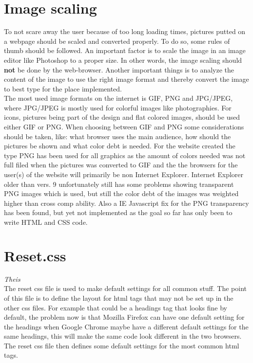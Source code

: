 \section{Image scaling}
To not scare away the user because of too long loading times, pictures putted on a webpage should be scaled and converted properly. To do so, some rules of thumb should be followed. An important factor is to scale the image in an image editor like Photoshop to a proper size. In other words, the image scaling should \textbf{not} be done by the web-browser. Another important things is to analyze the content of the image to use the right image format and thereby convert the image to best type for the place implemented.
\\The most used image formats on the internet is GIF, PNG and JPG/JPEG, where JPG/JPEG is mostly used for colorful images like photographies. For icons, pictures being part of the design and flat colored images, should be used either GIF or PNG. When choosing between GIF and PNG some considerations should be taken, like: what browser uses the main audience, how should the pictures be shown and what color debt is needed. For the website created the type PNG has been used for all graphics as the amount of colors needed was not full filed when the pictures was converted to GIF and the the browsers for the user(s) of the website will primarily be non Internet Explorer. Internet Explorer older than vers. 9 unfortunately still has some problems showing transparent PNG images which is used, but still the color debt of the images was weighted higher than cross comp ability. Also a IE Javascript fix for the PNG transparency has been found, but yet not implemented as the goal so far has only been to write HTML and CSS code. 

\section{Reset.css} \textit{Theis}\\
The reset css file is used to make default settings for all common stuff. The point of this file is to define the layout for html tags that may not be set up in the other css files. For example that could be a headings tag that looks fine by default, the problem now is that Mozilla Firefox can have one default setting for the headings when Google Chrome maybe have a different default settings for the same headings, this will make the same code look different in the two browsers. The reset css file then defines some default settings for the most common html tags.
